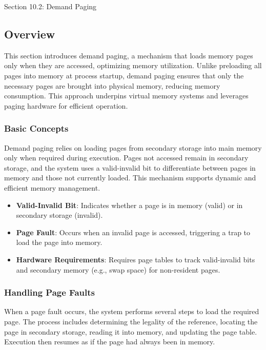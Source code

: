 \begin{notes}{Section 10.2: Demand Paging}
    \subsection*{Overview}

    This section introduces demand paging, a mechanism that loads memory pages only when they are accessed, optimizing memory utilization. Unlike preloading all pages into memory at process startup, 
    demand paging ensures that only the necessary pages are brought into physical memory, reducing memory consumption. This approach underpins virtual memory systems and leverages paging hardware for 
    efficient operation.
    
    \subsubsection*{Basic Concepts}
    
    Demand paging relies on loading pages from secondary storage into main memory only when required during execution. Pages not accessed remain in secondary storage, and the system uses a valid-invalid 
    bit to differentiate between pages in memory and those not currently loaded. This mechanism supports dynamic and efficient memory management.
    
    \begin{highlight}
    \begin{itemize}
        \item \textbf{Valid-Invalid Bit}: Indicates whether a page is in memory (valid) or in secondary storage (invalid).
        \item \textbf{Page Fault}: Occurs when an invalid page is accessed, triggering a trap to load the page into memory.
        \item \textbf{Hardware Requirements}: Requires page tables to track valid-invalid bits and secondary memory (e.g., swap space) for non-resident pages.
    \end{itemize}
    \end{highlight}
    
    \subsubsection*{Handling Page Faults}
    
    When a page fault occurs, the system performs several steps to load the required page. The process includes determining the legality of the reference, locating the page in secondary storage, reading 
    it into memory, and updating the page table. Execution then resumes as if the page had always been in memory.
    

\end{notes}
